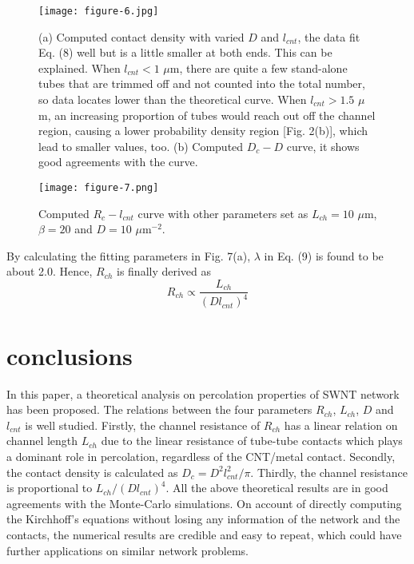 \documentclass[letterpaper, 10 pt, conference]{ieeeconf}
\begin{document}
\begin{figure}[!h]
  \texttt{[image: figure-6.jpg]}
  \caption{
    (a) Computed contact density with varied $D$ and $l_{cnt}$, the data fit Eq. (8) well but is a little smaller at both ends. This can be explained. When $l_{cnt}<1$ $\mu$m, there are quite a few stand-alone tubes that are trimmed off and not counted into the total number, so data locates lower than the theoretical curve. When $l_{cnt}>1.5$ $\mu$m, an increasing proportion of tubes would reach out off the channel region, causing a lower probability density region [Fig. 2(b)], which lead to smaller values, too. (b) Computed $D_c-D$ curve, it shows good agreements with the curve.
  }
\end{figure}
\begin{figure}[!h]
  \texttt{[image: figure-7.png]}
  \caption{
    Computed $R_c-l_{cnt}$ curve with other parameters set as $L_{ch}=10$ $\mu$m, $\beta=20$ and $D=10$ $\mu$m$^{-2}$.
  }
\end{figure}

By calculating the fitting parameters in Fig. 7(a), $\lambda$ in Eq. (9) is found to be about 2.0. Hence, $R_{ch}$ is finally derived as
\begin{equation}
  R_{ch}\propto\frac{L_{ch}}{(Dl_{cnt})^{4}}
\end{equation}

\section{conclusions}
In this paper, a theoretical analysis on percolation properties of SWNT network has been proposed. The relations between the four parameters $R_{ch}$, $L_{ch}$, $D$ and $l_{cnt}$ is well studied. Firstly, the channel resistance of $R_{ch}$ has a linear relation on channel length $L_{ch}$ due to the linear resistance of tube-tube contacts which plays a dominant role in percolation, regardless of the CNT/metal contact. Secondly, the contact density is calculated as $D_c=D^2l_{cnt}^2/\pi$. Thirdly, the channel resistance is proportional to $L_{ch}/(Dl_{cnt})^4$. All the above theoretical results are in good agreements with the Monte-Carlo simulations. On account of directly computing the Kirchhoff's equations without losing any information of the network and the contacts, the numerical results are credible and easy to repeat, which could have further applications on similar network problems.
\end{document}
